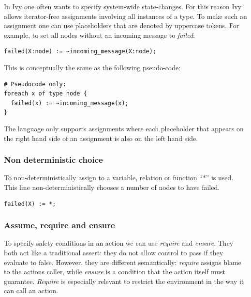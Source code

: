 \documentclass[fleqn]{article}
\begin{document}
In Ivy one often wants to specify system-wide state-changes. For this reason Ivy allows iterator-free assignments involving all instances of a type. To make such an assignment one can use placeholders that are denoted by uppercase tokens. For example, to set all nodes without an incoming message to \textit{failed}:

\begin{mdframed}[backgroundcolor=light-gray, roundcorner=10pt,leftmargin=1, rightmargin=1, innerleftmargin=15, innertopmargin=15,innerbottommargin=15, outerlinewidth=1, linecolor=light-gray]
\begin{lstlisting}
failed(X:node) := ~incoming_message(X:node);
\end{lstlisting}
\end{mdframed}

\noindent This is conceptually the same as the following pseudo-code:

\begin{mdframed}[backgroundcolor=light-gray, roundcorner=10pt,leftmargin=1, rightmargin=1, innerleftmargin=15, innertopmargin=15,innerbottommargin=15, outerlinewidth=1, linecolor=light-gray]
\begin{lstlisting}
# Pseudocode only:
foreach x of type node {
  failed(x) := ~incoming_message(x);
}
\end{lstlisting}
\end{mdframed}

The language only supports assignments where each placeholder that appears on the right hand side of an assignment is also on the left hand side.


\subsubsection{Non deterministic choice}
To non-deterministically assign to a variable, relation or function ``*'' is used.
This line non-deterministically chooses a number of nodes to have failed.

\begin{mdframed}[backgroundcolor=light-gray, roundcorner=10pt,leftmargin=1, rightmargin=1, innerleftmargin=15, innertopmargin=15,innerbottommargin=15, outerlinewidth=1, linecolor=light-gray]
\begin{lstlisting}
failed(X) := *;
\end{lstlisting}
\end{mdframed}

\subsubsection{Assume, require and ensure}
To specify safety conditions in an action we can use \textit{require} and \textit{ensure}.
They both act like a traditional assert: they do not allow control to pass if they evaluate to false.
However, they are different semantically: \textit{require} assigns blame to the actions caller, while \textit{ensure}
is a condition that the action itself must guarantee. \textit{Require} is especially relevant to restrict
the environment in the way it can call an action.
\end{document}
